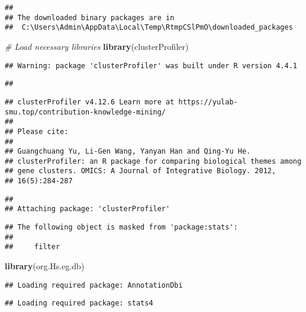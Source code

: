 \documentclass[
]{article}
\newenvironment{Shaded}{\begin{snugshade}}{\end{snugshade}}
\newcommand{\CommentTok}[1]{\textcolor[rgb]{0.56,0.35,0.01}{\textit{#1}}}
\newcommand{\FunctionTok}[1]{\textcolor[rgb]{0.13,0.29,0.53}{\textbf{#1}}}
\newcommand{\NormalTok}[1]{#1}
\begin{document}
\begin{verbatim}
## 
## The downloaded binary packages are in
##  C:\Users\Admin\AppData\Local\Temp\RtmpCSlPmO\downloaded_packages
\end{verbatim}

\begin{Shaded}
\begin{Highlighting}[]
\CommentTok{\# Load necessary libraries}
\FunctionTok{library}\NormalTok{(clusterProfiler)}
\end{Highlighting}
\end{Shaded}

\begin{verbatim}
## Warning: package 'clusterProfiler' was built under R version 4.4.1
\end{verbatim}

\begin{verbatim}
## 
\end{verbatim}

\begin{verbatim}
## clusterProfiler v4.12.6 Learn more at https://yulab-smu.top/contribution-knowledge-mining/
## 
## Please cite:
## 
## Guangchuang Yu, Li-Gen Wang, Yanyan Han and Qing-Yu He.
## clusterProfiler: an R package for comparing biological themes among
## gene clusters. OMICS: A Journal of Integrative Biology. 2012,
## 16(5):284-287
\end{verbatim}

\begin{verbatim}
## 
## Attaching package: 'clusterProfiler'
\end{verbatim}

\begin{verbatim}
## The following object is masked from 'package:stats':
## 
##     filter
\end{verbatim}

\begin{Shaded}
\begin{Highlighting}[]
\FunctionTok{library}\NormalTok{(org.Hs.eg.db)}
\end{Highlighting}
\end{Shaded}

\begin{verbatim}
## Loading required package: AnnotationDbi
\end{verbatim}

\begin{verbatim}
## Loading required package: stats4
\end{verbatim}
\end{document}
